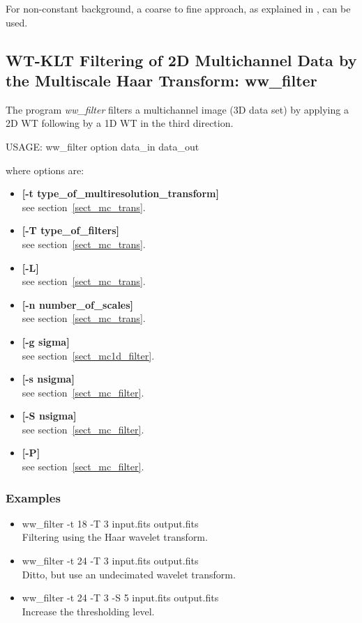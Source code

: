 For non-constant background, a coarse to fine approach, as explained in
\proj, can be used.

\subsection{WT-KLT Filtering of 2D Multichannel Data by the Multiscale
Haar Transform: ww\_filter}
The program 
{\em ww\_filter} filters 
a multichannel image (3D data set) by applying a 2D  WT following
by a 1D WT in the third direction.
{\bf
\begin{center}
 USAGE: ww\_filter option data\_in data\_out
\end{center}}
where options are: 
\begin{itemize} 
\baselineskip=0.4truecm
\itemsep=0.1truecm
\item {\bf [-t type\_of\_multiresolution\_transform]} \\
see section~\ref{sect_mc_trans}.  
\item {\bf [-T type\_of\_filters]}  \\ 
see section~\ref{sect_mc_trans}.
\item {\bf [-L]} \\
see section~\ref{sect_mc_trans}.  
\item {\bf [-n number\_of\_scales]} \\
see section~\ref{sect_mc_trans}.  
\item {\bf [-g sigma]}\\
see section~\ref{sect_mc1d_filter}.
\item {\bf [-s nsigma]} \\
see section~\ref{sect_mc_filter}.  
\item {\bf [-S nsigma]} \\
see section~\ref{sect_mc_filter}.  
\item {\bf [-P]} \\
see section~\ref{sect_mc_filter}. 
\end{itemize}
\subsubsection*{Examples}
\begin{itemize}
\baselineskip=0.4truecm
\itemsep=0.1truecm
\item ww\_filter -t 18 -T 3 input.fits output.fits \\
Filtering using the Haar  wavelet transform.
\item ww\_filter -t 24 -T 3 input.fits output.fits \\
Ditto, but use an undecimated wavelet transform.
\item ww\_filter  -t 24 -T 3 -S 5 input.fits output.fits \\
Increase the thresholding level.
\end{itemize}

